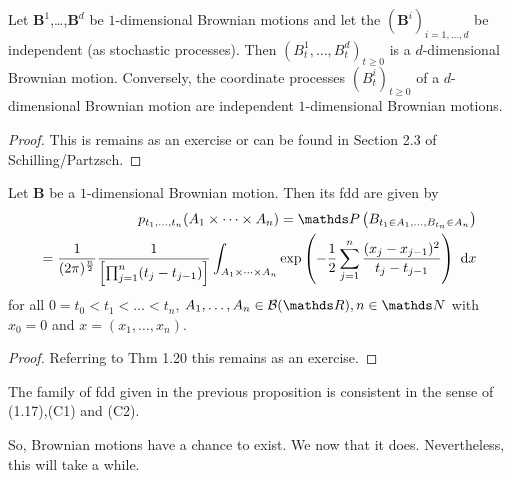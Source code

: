 \begin{prop}
Let $\textbf{B}^1$,\dots,$\textbf{B}^d$ be $1$-dimensional Brownian motions and
let the $(\textbf{B}^i)_{i=1,\dots,d}$ be independent (as stochastic processes).
Then $\left(B_t^1,\dots,B_t^d\right)_{t\geq 0}$ is a $d$-dimensional Brownian motion.
Conversely, the coordinate processes $\left(B_t^i\right)_{t \geq 0}$ of a $d$-dimensional Brownian motion are independent $1$-dimensional Brownian motions.
\begin{proof}
This is remains as an exercise or can be found in Section 2.3 of Schilling/Partzsch.
\end{proof}
\end{prop}

\begin{prop}
Let $\textbf{B}$ be a $1$-dimensional Brownian motion. Then its fdd are given by
\begin{align}
p_{t_1,\dots ,t_n}(A_1\times \dots \times A_n) = \Prob\left(B_{t_1\in A_1,\dots,B_{t_n}\in A_n}  \right) \nonumber \\
=\frac{1}{(2\pi)^{\frac{n}{2}}}\frac{1}{\left[\prod_{j=1}^n(t_j-t_{j-1})\right]} \int_{A_1\times \dots \times A_n} \exp\left(-\frac{1}{2}\sum_{j=1}^n \frac{(x_j-x_{j-1})^2}{t_j-t_{j-1}}\right)~\mathrm{d}x
\end{align}
for all $0=t_0<t_1<\dots < t_n$, $A_1, \dots , A_n \in  \Borel(\R), n\in \N$ with $x_0=0$ and $x=(x_1,\dots , x_n)$.
\begin{proof}
Referring to Thm 1.20 this remains as an exercise.
\end{proof}
\end{prop}

\begin{prop}
The family of fdd given in the previous proposition is consistent in the sense of (1.17),(C1) and (C2).
\end{prop}

So, Brownian motions have a chance to exist. We now that it does. Nevertheless, this will take a while.

